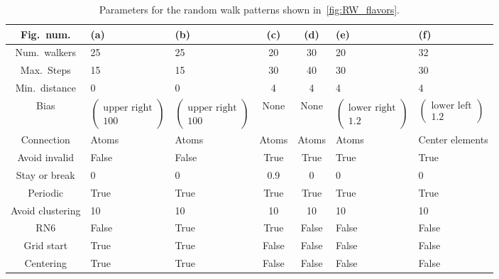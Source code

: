 \begin{table}[H]
  \begin{center}
  \caption{Parameters for the random walk patterns shown in~\cref{fig:RW_flavors}.}
  \label{tab:RW_flavors}
  \begin{tabular}{ |c|M{2.2cm}|M{2.2cm}|c|c|M{2.2cm}|M{2.2cm}|} \hline
  Fig.\ num. & (a) & (b) & (c) & (d) & (e) & (f) \\ \hline 
  Num.\ walkers & 25 & 25 & 20 & 30 & 20 & 32 \\ \hline 
  Max.\ Steps & 15 & 15 & 30 & 40 & 30 & 30 \\ \hline 
  Min.\ distance & 0 & 0 & 4 & 4 & 4 & 4 \\ \hline 
  Bias & $\begin{pmatrix} \text{upper right} \\ 100 \end{pmatrix}$ & $\begin{pmatrix} \text{upper right} \\ 100 \end{pmatrix}$ & None & None & $\begin{pmatrix} \text{lower right} \\ 1.2 \end{pmatrix}$ & $\begin{pmatrix} \text{lower left} \\ 1.2 \end{pmatrix}$ \\ \hline 
  Connection & Atoms & Atoms & Atoms & Atoms & Atoms & Center elements \\ \hline  
  Avoid invalid & False & False & True & True & True & True \\ \hline  
  Stay or break & 0 & 0 & 0.9 & 0 & 0 & 0 \\ \hline  
  Periodic & True & True & True & True & True & True \\ \hline  
  Avoid clustering & 10 & 10 & 10 & 10 & 10 & 10 \\ \hline  
  RN6 & False & True & True & False & False & False \\ \hline 
  Grid start & True & True & False & False & False & False \\ \hline 
  Centering & True & True & False & False & False & False \\ \hline 
  \end{tabular}
\end{center}
\end{table}


